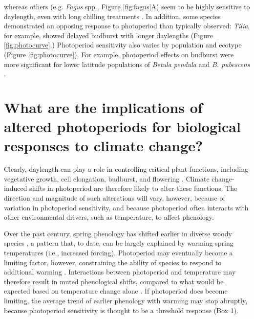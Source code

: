 \documentclass{article}
\begin{document}
whereas others (e.g. \emph{Fagus} spp., Figure \ref{fig:fagus}A) seem to be highly sensitive to daylength, even with long chilling treatments \citep{zohner2016}. In addition, some species demonstrated an opposing response to photoperiod than typically observed: \emph{Tilia}, for example, showed delayed budburst with longer daylengths (Figure \ref{fig:photocurve},\citep{Ashby:1962aa}) %
Photoperiod sensitivity also varies by population and ecotype \citep[e.g.,][]{Partanen:2005aa,flynn2018} (Figure \ref{fig:photocurve}). For example, photoperiod effects on budburst were more significant for lower latitude populations of \emph{Betula pendula} and \emph{B. pubescens} \citep{Partanen:2005aa}. %

\section*{What are the implications of altered photoperiods for biological responses to climate change?}
\par Clearly, daylength can play a role in controlling critical plant functions, including vegetative growth, cell elongation, budburst, and flowering \citep{Linkosalo:2006aa,erwin1998,sidaway2010, Hsu:2011,Heide:2011aa,Ashby:1962aa,Heide:2012aa,mimura2007}. Climate change-induced shifts in photoperiod are therefore likely to alter these functions. The direction and magnitude of such alterations will vary, however, because of variation in photoperiod sensitivity, and because photoperiod often interacts with other environmental drivers, such as temperature, to affect phenology. 

\par Over the past century, spring phenology has shifted earlier in diverse woody species \citep{menzel2000}, a pattern that, to date, can be largely explained by warming spring temperatures (i.e., increased forcing). Photoperiod may eventually become a limiting factor, however, constraining the ability of species to respond to additional warming \citep{koerner2010b,vitasse2013, Morin:2010aa,Nienstaedt:1966aa}. Interactions between photoperiod and temperature may therefore result in muted phenological shifts, compared to what would be expected based on temperature change alone \citep{wareing1956,mimura2007,koerner2010b}. If photoperiod does become limiting, the average trend of earlier phenology with warming may stop abruptly, because photoperiod sensitivity is thought to be a threshold response (Box 1). %
\end{document}
